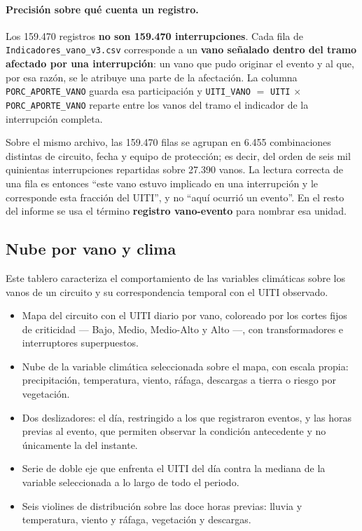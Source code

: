 \documentclass[11pt,a4paper]{article}
\begin{document}
\begin{bloquenuevo}
\paragraph{Precisión sobre qué cuenta un registro.} Los 159.470 registros \textbf{no son
159.470 interrupciones}. Cada fila de \texttt{Indicadores\_vano\_v3.csv} corresponde a un
\textbf{vano señalado dentro del tramo afectado por una interrupción}: un vano que pudo
originar el evento y al que, por esa razón, se le atribuye una parte de la afectación. La
columna \texttt{PORC\_APORTE\_VANO} guarda esa participación y
\texttt{UITI\_VANO} $=$ \texttt{UITI} $\times$ \texttt{PORC\_APORTE\_VANO} reparte entre los
vanos del tramo el indicador de la interrupción completa.

Sobre el mismo archivo, las 159.470 filas se agrupan en 6.455 combinaciones distintas de
circuito, fecha y equipo de protección; es decir, del orden de seis mil quinientas
interrupciones repartidas sobre 27.390 vanos. La lectura correcta de una fila es entonces
``este vano estuvo implicado en una interrupción y le corresponde esta fracción del UITI'', y
no ``aquí ocurrió un evento''. En el resto del informe se usa el término \textbf{registro
vano-evento} para nombrar esa unidad.
\end{bloquenuevo}

\subsection{Nube por vano y clima}

Este tablero caracteriza el comportamiento de las variables climáticas sobre los vanos de un
circuito y su correspondencia temporal con el UITI observado.

\begin{itemize}
  \item Mapa del circuito con el UITI diario por vano, coloreado por los cortes fijos de
        criticidad --- Bajo, Medio, Medio-Alto y Alto ---, con transformadores e
        interruptores superpuestos.
  \item Nube de la variable climática seleccionada sobre el mapa, con escala propia:
        precipitación, temperatura, viento, ráfaga, descargas a tierra o riesgo por
        vegetación.
  \item Dos deslizadores: el día, restringido a los que registraron eventos, y las horas
        previas al evento, que permiten observar la condición antecedente y no únicamente la
        del instante.
  \item Serie de doble eje que enfrenta el UITI del día contra la mediana de la variable
        seleccionada a lo largo de todo el periodo.
  \item Seis violines de distribución sobre las doce horas previas: lluvia y temperatura,
        viento y ráfaga, vegetación y descargas.
\end{itemize}
\end{document}
